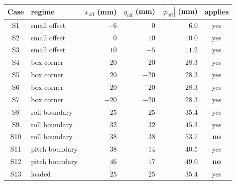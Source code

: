 \begin{tabular}{c l r r r c}
  \toprule
  Case & regime & {$x_{\mathrm{off}}$ (mm)} & {$y_{\mathrm{off}}$ (mm)} & {$|p_{\mathrm{off}}|$ (mm)} & applies \\
  \midrule
  S1 & small offset & $-6$ & $0$ & $6.0$ & yes \\
  S2 & small offset & $0$ & $10$ & $10.0$ & yes \\
  S3 & small offset & $10$ & $-5$ & $11.2$ & yes \\
  \addlinespace
  S4 & box corner & $20$ & $20$ & $28.3$ & yes \\
  S5 & box corner & $20$ & $-20$ & $28.3$ & yes \\
  S6 & box corner & $-20$ & $20$ & $28.3$ & yes \\
  S7 & box corner & $-20$ & $-20$ & $28.3$ & yes \\
  \addlinespace
  S8 & roll boundary & $25$ & $25$ & $35.4$ & yes \\
  S9 & roll boundary & $32$ & $32$ & $45.3$ & yes \\
  S10 & roll boundary & $38$ & $38$ & $53.7$ & \textbf{no} \\
  \addlinespace
  S11 & pitch boundary & $38$ & $14$ & $40.5$ & yes \\
  S12 & pitch boundary & $46$ & $17$ & $49.0$ & \textbf{no} \\
  \addlinespace
  S13 & loaded & $25$ & $25$ & $35.4$ & yes \\
  \bottomrule
\end{tabular}
